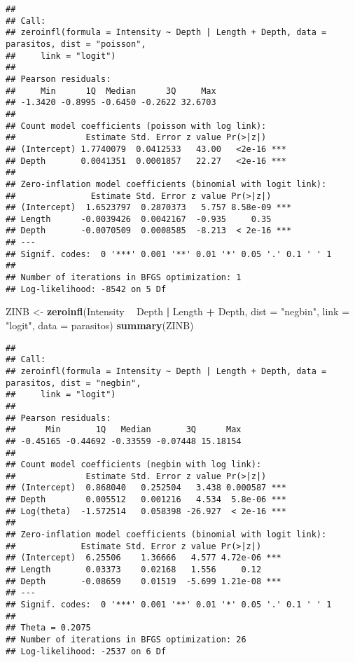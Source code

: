 \documentclass[
]{book}
\newenvironment{Shaded}{\begin{snugshade}}{\end{snugshade}}
\newcommand{\DataTypeTok}[1]{\textcolor[rgb]{0.13,0.29,0.53}{#1}}
\newcommand{\KeywordTok}[1]{\textcolor[rgb]{0.13,0.29,0.53}{\textbf{#1}}}
\newcommand{\NormalTok}[1]{#1}
\newcommand{\OperatorTok}[1]{\textcolor[rgb]{0.81,0.36,0.00}{\textbf{#1}}}
\newcommand{\StringTok}[1]{\textcolor[rgb]{0.31,0.60,0.02}{#1}}
\begin{document}
\begin{verbatim}
## 
## Call:
## zeroinfl(formula = Intensity ~ Depth | Length + Depth, data = parasitos, dist = "poisson", 
##     link = "logit")
## 
## Pearson residuals:
##     Min      1Q  Median      3Q     Max 
## -1.3420 -0.8995 -0.6450 -0.2622 32.6703 
## 
## Count model coefficients (poisson with log link):
##              Estimate Std. Error z value Pr(>|z|)    
## (Intercept) 1.7740079  0.0412533   43.00   <2e-16 ***
## Depth       0.0041351  0.0001857   22.27   <2e-16 ***
## 
## Zero-inflation model coefficients (binomial with logit link):
##               Estimate Std. Error z value Pr(>|z|)    
## (Intercept)  1.6523797  0.2870373   5.757 8.58e-09 ***
## Length      -0.0039426  0.0042167  -0.935     0.35    
## Depth       -0.0070509  0.0008585  -8.213  < 2e-16 ***
## ---
## Signif. codes:  0 '***' 0.001 '**' 0.01 '*' 0.05 '.' 0.1 ' ' 1 
## 
## Number of iterations in BFGS optimization: 1 
## Log-likelihood: -8542 on 5 Df
\end{verbatim}

\begin{Shaded}
\begin{Highlighting}[]
\NormalTok{ZINB <-}\StringTok{ }\KeywordTok{zeroinfl}\NormalTok{(Intensity }\OperatorTok{~}\StringTok{ }\NormalTok{Depth }\OperatorTok{|}\StringTok{ }\NormalTok{Length }\OperatorTok{+}\StringTok{ }\NormalTok{Depth, }\DataTypeTok{dist =} \StringTok{"negbin"}\NormalTok{, }
\DataTypeTok{link =} \StringTok{"logit"}\NormalTok{, }\DataTypeTok{data =}\NormalTok{ parasitos)}
\KeywordTok{summary}\NormalTok{(ZINB)}
\end{Highlighting}
\end{Shaded}

\begin{verbatim}
## 
## Call:
## zeroinfl(formula = Intensity ~ Depth | Length + Depth, data = parasitos, dist = "negbin", 
##     link = "logit")
## 
## Pearson residuals:
##      Min       1Q   Median       3Q      Max 
## -0.45165 -0.44692 -0.33559 -0.07448 15.18154 
## 
## Count model coefficients (negbin with log link):
##              Estimate Std. Error z value Pr(>|z|)    
## (Intercept)  0.868040   0.252504   3.438 0.000587 ***
## Depth        0.005512   0.001216   4.534  5.8e-06 ***
## Log(theta)  -1.572514   0.058398 -26.927  < 2e-16 ***
## 
## Zero-inflation model coefficients (binomial with logit link):
##             Estimate Std. Error z value Pr(>|z|)    
## (Intercept)  6.25506    1.36666   4.577 4.72e-06 ***
## Length       0.03373    0.02168   1.556     0.12    
## Depth       -0.08659    0.01519  -5.699 1.21e-08 ***
## ---
## Signif. codes:  0 '***' 0.001 '**' 0.01 '*' 0.05 '.' 0.1 ' ' 1 
## 
## Theta = 0.2075 
## Number of iterations in BFGS optimization: 26 
## Log-likelihood: -2537 on 6 Df
\end{verbatim}
\end{document}
